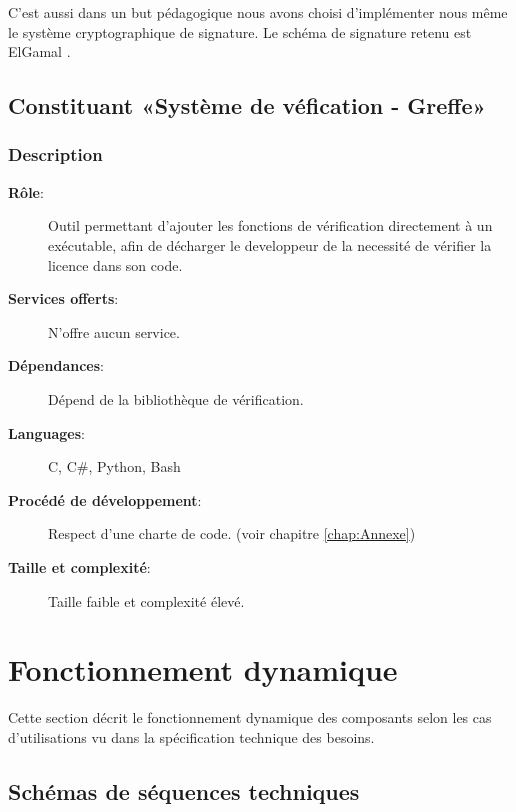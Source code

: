 C'est aussi dans un but pédagogique nous avons choisi d'implémenter nous même le système cryptographique de signature. Le schéma de signature retenu est ElGamal \cite{ElGamal}.

\section{Constituant «Système de véfication - Greffe»}
\subsection{Description}
\begin{description}
	\item[\textbf{Rôle}:]
			Outil permettant d'ajouter les fonctions de vérification directement à un
			exécutable, afin de décharger le developpeur de la necessité de vérifier 
			la licence dans son code.
	\item[\textbf{Services offerts}:]
		N'offre aucun service.
	\item[\textbf{Dépendances}:]
		Dépend de la bibliothèque de vérification.
	\item[\textbf{Languages}:]
		C, C\#, Python, Bash 
	\item[\textbf{Procédé de développement}:]
		Respect d'une charte de code. (voir chapitre \ref{chap:Annexe}) 
	\item[\textbf{Taille et complexité}:]
		Taille faible et complexité élevé.
\end{description}


\chapter{Fonctionnement dynamique}
Cette section décrit le fonctionnement dynamique des composants selon les cas d'utilisations vu
dans la spécification technique des besoins.

\section{Schémas de séquences techniques}

